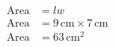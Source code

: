 \documentclass[12pt]{article}
\begin{document}
\hfill
\begin{minipage}{.4\textwidth}
  \begin{align*}
  \text{Area} &= lw \\
  \text{Area} &= 9 \,\text{cm} \times 7 \,\text{cm} \\
  \text{Area} &= 63 \,\text{cm}^2
  \end{align*}
\end{minipage}
\par\vspace{1cm}
\end{document}
